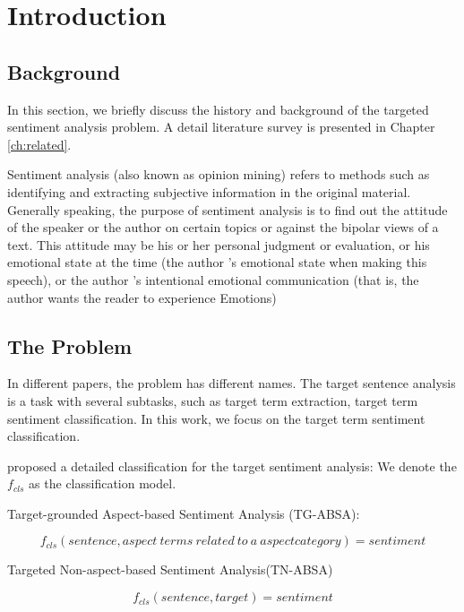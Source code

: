 \documentclass[fyp]{socreport}
\begin{document}
\listoffigures 
\listoftables
\tableofcontents 

\chapter{Introduction}  
 

\section{Background}
In this section, we briefly discuss the history and background of the targeted sentiment analysis problem.  A detail literature survey is presented in 
Chapter \ref{ch:related}.

Sentiment analysis (also known as opinion mining) refers to methods such as identifying and extracting subjective information in the original material. Generally speaking, the purpose of sentiment analysis is to find out the attitude of the speaker or the author on certain topics or against the bipolar views of a text. This attitude may be his or her personal judgment or evaluation, or his emotional state at the time (the author ’s emotional state when making this speech), or the author ’s intentional emotional communication (that is, the author wants the reader to experience Emotions)


\section{The Problem}
In different papers, the problem has different names. The target sentence analysis is a task with several subtasks, such as target term extraction, target term sentiment classification. In this work, we focus on the target term sentiment classification.


\cite{pei2019targeted} proposed a detailed classification for the target sentiment analysis: 
We denote the $f_{cls}$ as the classification model.

Target-grounded Aspect-based Sentiment Analysis (TG-ABSA):

\begin{equation}
    f_{cls}(sentence,aspect\ terms\ related\ to\ a\ aspect category) =sentiment
\end{equation}

Targeted Non-aspect-based Sentiment Analysis(TN-ABSA)

\begin{equation}
f_{cls}(sentence,target)=sentiment
\end{equation}\label{TSA_definition}
\end{document}
